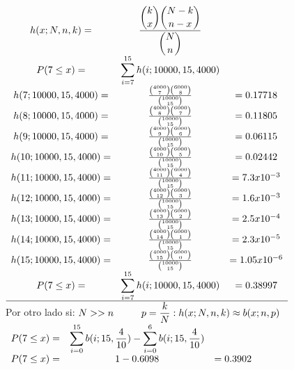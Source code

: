 \documentclass[12pt, letterpaper]{article}
\begin{document}
    \begin{center}
        \begin{math}
            \begin{array}{ccc}
                h(x;N,n,k)=&\displaystyle\frac{{\displaystyle\binom{k}{x} \displaystyle\binom{N-k}{n-x}}}{\displaystyle\binom{N}{n}}&\\
                P(7\leq x)=&\displaystyle\sum^{15}_{i=7} h(i;10000,15,4000)&\\ 
                h(7;10000,15,4000)= & \frac{\binom{4000}{7} \binom{6000}{8}}{\binom{10000}{15}}&=0.17718\\
                h(8;10000,15,4000)= & \frac{\binom{4000}{8} \binom{6000}{7}}{\binom{10000}{15}}&=0.11805\\
                h(9;10000,15,4000)= & \frac{\binom{4000}{9} \binom{6000}{6}}{\binom{10000}{15}}&=0.06115\\
                h(10;10000,15,4000)= & \frac{\binom{4000}{10} \binom{6000}{5}}{\binom{10000}{15}}&=0.02442\\
                h(11;10000,15,4000)= & \frac{\binom{4000}{11} \binom{6000}{4}}{\binom{10000}{15}}&=7.3x10^{-3}\\
                h(12;10000,15,4000)= & \frac{\binom{4000}{12} \binom{6000}{3}}{\binom{10000}{15}}&=1.6x10^{-3}\\
                h(13;10000,15,4000)= & \frac{\binom{4000}{13} \binom{6000}{2}}{\binom{10000}{15}}&=2.5x10^{-4}\\
                h(14;10000,15,4000)= & \frac{\binom{4000}{14} \binom{6000}{1}}{\binom{10000}{15}}&=2.3x10^{-5}\\
                h(15;10000,15,4000)= & \frac{\binom{4000}{15} \binom{6000}{0}}{\binom{10000}{15}}&=1.05x10^{-6}\\
                P(7\leq x)=&\displaystyle\sum^{15}_{i=7} h(i;10000,15,4000)&=0.38997\\
                \hline
                \end{array}
        \end{math}\\
        Por otro lado si: $N>>n \hspace{1 cm}   p = \displaystyle\frac{k}{N} :  h(x;N,n,k) \approx b(x;n,p)$\\
        \begin{math}
            \begin{array}{c c c}
                P(7\leq x)=&\displaystyle\sum^{15}_{i=0} b(i;15,\displaystyle\frac{4}{10})- \displaystyle\sum^{6}_{i=0} b(i;15,\displaystyle\frac{4}{10})&\\
                P(7\leq x)=&1-0.6098&= 0.3902\\   
            \end{array}
        \end{math}
    \end{center}
\end{document}
